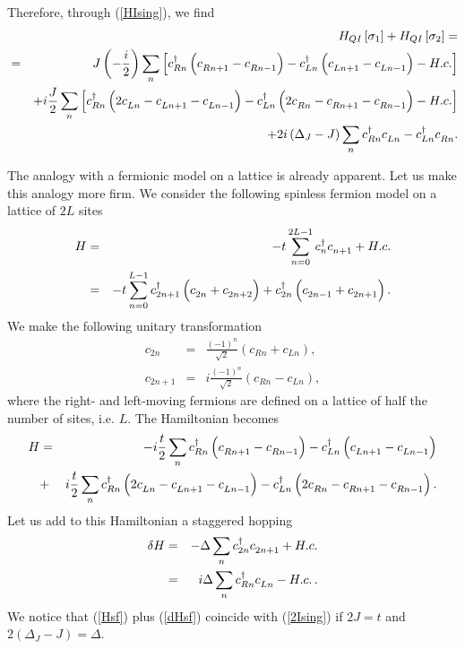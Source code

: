 Therefore, through (\ref{HIsing}), we find
\begin{eqnarray}
&&H_{QI}\left[\sigma_1\right] + H_{QI}\left[\sigma_2\right] = \nonumber\\
&=&J\left(-\frac{i}{2}\right)\sum_n
\left[  c^\dagger_{Rn}\left(c^\pdag_{Rn+1}-c^\pdag_{Rn-1}\right) -c^\dagger_{Ln}\left(c^\pdag_{Ln+1}-c^\pdag_{Ln-1}\right) - H.c.\right]
\nonumber\\
&&+i\frac{J}{2}\sum_n \left[ c^\dagger_{Rn}\left(2c^\pdag_{Ln}-c^\pdag_{Ln+1}-c^\pdag_{Ln-1}\right) -c^\dagger_{Ln}\left(2c^\pdag_{Rn}-c^\pdag_{Rn+1}-c^\pdag_{Rn-1}\right) - H.c.\right]
\nonumber\\
&& +2i\left(\Delta_J-J\right)\sum_n c^\dagger_{Rn}c^\pdag_{Ln}
-c^\dagger_{Ln}c^\pdag_{Rn}.
\label{2Ising}
\end{eqnarray}

The analogy with a fermionic model on a lattice is already apparent.
Let us make this analogy more firm. We consider the following
spinless fermion model on a lattice of $2L$ sites
\begin{eqnarray*}
H &=& -t\sum_{n=0}^{2L-1} c^\dagger_n c^\pdag_{n+1} + H.c.\\
&=& -t\sum_{n=0}^{L-1} c^\dagger_{2n+1}\left(c^\pdag_{2n}
+ c^\pdag_{2n+2}\right)
+c^\dagger_{2n}\left(c^\pdag_{2n-1}+c^\pdag_{2n+1}\right).
\end{eqnarray*}
We make the following unitary transformation
\begin{eqnarray*}
c_{2n} &=& \frac{(-1)^n}{\sqrt{2}}\left(c_{Rn}+c_{Ln}\right),\\
c_{2n+1} &=& i\frac{(-1)^n}{\sqrt{2}}\left(c_{Rn}-c_{Ln}\right),
\end{eqnarray*}
where the right- and left-moving fermions are defined on a lattice of
half the number of sites, i.e. $L$. The Hamiltonian becomes
\begin{eqnarray}
H&=& -i\frac{t}{2}\sum_n
c^\dagger_{Rn}\left(c^\pdag_{Rn+1}-c^\pdag_{Rn-1}\right)
-c^\dagger_{Ln}\left(c^\pdag_{Ln+1}-c^\pdag_{Ln-1}\right)\nonumber\\
&+&i\frac{t}{2}\sum_n
c^\dagger_{Rn}\left(2c^\pdag_{Ln}-c^\pdag_{Ln+1}-c^\pdag_{Ln-1}\right)
-c^\dagger_{Ln}\left(2c^\pdag_{Rn}-c^\pdag_{Rn+1}-c^\pdag_{Rn-1}\right).
\nonumber\\
\label{Hsf}
\end{eqnarray}
Let us add to this Hamiltonian a staggered hopping
\begin{eqnarray}
\delta H &=& -\Delta\sum_n c^\dagger_{2n}c^\pdag_{2n+1} + H.c.\\
&=& i\Delta\sum_n c^\dagger_{Rn}c^\pdag_{Ln} - H.c.\, .
\label{dHsf}
\end{eqnarray}
We notice that (\ref{Hsf}) plus
(\ref{dHsf}) coincide with (\ref{2Ising}) if $2J = t$ and $2(\Delta_J-J)
=\Delta$.

